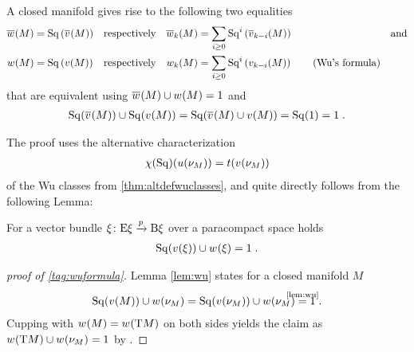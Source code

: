 \begin{Thm}[Wu]\label{thm:wu}
  A closed manifold gives rise to the following two equalities
  \begin{align}\notag
    {\overline{w}_{}}(M) &= \mathrm{Sq}\left({\overline{v}_{}}(M)\right)
    &\text{respectively}&
    &{\overline{w}_{k}}(M) &= \sum_{i\geq0} \mathrm{Sq}^{i}\left({\overline{v}_{k-i}}(M)\right)
    &\text{and}
    \\
    {w_{}}(M) &= \mathrm{Sq}\left({v_{}}(M)\right)
    &\text{respectively}&
    &{w_{k}}(M) &= \sum_{i\geq0} \mathrm{Sq}^{i}\left({v_{k-i}}(M)\right)
    \label{tag:wuformula}\tag{Wu's formula}
  \end{align}
  that are equivalent using
  ${\overline{w}_{}}(M)\cup{w_{}}(M) = 1$ and
  \begin{gather*}
    \mathrm{Sq}({\overline{v}_{}}(M))\cup\mathrm{Sq}({v_{}}(M))
    = \mathrm{Sq}({\overline{v}_{}}(M)\cup{v_{}}(M))
    = \mathrm{Sq}(1)
    = 1
    \;.
  \end{gather*}
\end{Thm}
The proof uses the alternative characterization
\begin{gather*}
  \chi(\mathrm{Sq})({u}(\nu_{M})) = t({v_{}}(\nu_{M}))
\end{gather*}
of the Wu classes from \autoref{thm:altdefwuclasses}, and quite directly
follows from the following Lemma:
\begin{Lem}\label{lem:wu}
  For a vector bundle $\xi\colon \mathrm{E}\xi\xrightarrow{p}\mathrm{B}\xi$ over a
  paracompact space holds
  \begin{gather*}
    \mathrm{Sq}({v_{}}(\xi)) \cup {w_{}}(\xi)= 1
    \;.
  \end{gather*}
\end{Lem}
\begin{proof}[proof of \ref{tag:wuformula}]
  Lemma \autoref{lem:wu} states for a closed manifold $M$
  \begin{gather*}
    \SQ(\V{M}) \cup \W{\N M}
    = \SQ(\V{\N M}) \cup \W{\N M}
    \cequalsby{\autoref{lem:wu}} 1
    \;.
  \end{gather*}
  Cupping with ${w_{}}(M)={w_{}}(\mathrm{T}M)$ on both sides yields the claim
  as ${w_{}}(\mathrm{T}M) \cup {w_{}}(\nu_{M}) = 1$ by
  .
\end{proof}
